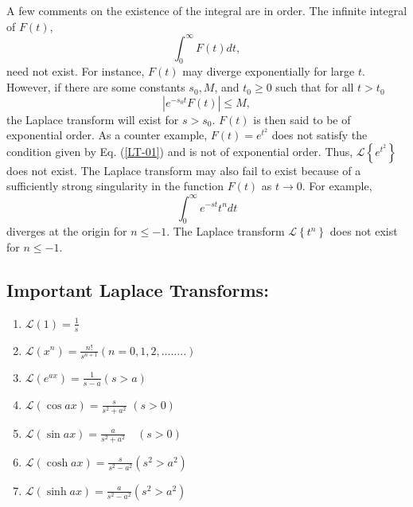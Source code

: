 A few comments on the existence of the integral are in order. The infinite integral of $F(t)$,
\begin{equation*}
\int_{0}^{\infty} F(t) d t,
\end{equation*}
need not exist. For instance, $F(t)$ may diverge exponentially for large $t$. However, if there are some constants $s_{0}, M$, and $t_{0} \geq 0$ such that for all $t>t_{0}$
\begin{equation}
\left|e^{-s_{0} t} F(t)\right| \leq M,\label{LT-01}
\end{equation}
the Laplace transform will exist for $s>s_{0} $. $F(t)$ is then said to be of exponential order. As a counter example, $F(t)=e^{t^{2}}$ does not satisfy the condition given by Eq. (\ref{LT-01}) and is not of exponential order. Thus, $\mathcal{L}\left\{e^{t^{2}}\right\}$ does not exist.
The Laplace transform may also fail to exist because of a sufficiently strong singularity in the function $F(t)$ as $t \rightarrow 0$. For example,
\begin{equation*}
\int_{0}^{\infty} e^{-s t} t^{n} d t
\end{equation*}
diverges at the origin for $n \leq-1$. The Laplace transform $\mathcal{L}\left\{t^{n}\right\}$ does not exist for $n \leq-1$. 

\subsection{Important Laplace Transforms:}
\begin{enumerate}
	\item $\mathcal{L}(1)=\frac{1}{s}$
	\item $\mathcal{L}\left(x^{n}\right)=\frac{n !}{s^{n+1}}(n=0,1,2, \ldots \ldots . .)$
	\item $\mathcal{L}\left(e^{a x}\right)=\frac{1}{s-a}(s>a)$
	\item $\mathcal{L}(\cos a x)=\frac{s}{s^{2}+a^{2}}$
	$(s>0)$
	\item $\mathcal{L}(\sin a x)=\frac{a}{s^{2}+a^{2}} \quad(s>0)$
	\item $\mathcal{L}(\cosh a x)=\frac{s}{s^{2}-a^{2}}\left(s^{2}>a^{2}\right)$
	\item $\mathcal{L}(\sinh a x)=\frac{a}{s^{2}-a^{2}}\left(s^{2}>a^{2}\right)$
\end{enumerate}

